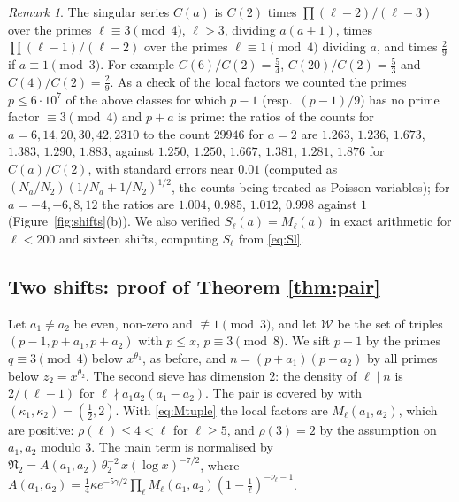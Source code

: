 \documentclass[11pt,a4paper]{amsart}
\theoremstyle{remark}
\newtheorem{remark}[theorem]{Remark}
\numberwithin{equation}{section}
\newcommand{\cW}{\mathcal W}
\newcommand{\cN}{\mathfrak N}
\begin{document}
\begin{remark}\label{rem:counts}
The singular series $C(a)$ is $C(2)$ times $\prod(\ell-2)/(\ell-3)$ over the primes $\ell\equiv3\pmod 4$,
$\ell>3$, dividing $a(a+1)$, times $\prod(\ell-1)/(\ell-2)$ over the primes $\ell\equiv1\pmod4$ dividing $a$,
and times $\frac29$ if $a\equiv1\pmod3$. For example $C(6)/C(2)=\frac54$, $C(20)/C(2)=\frac53$ and
$C(4)/C(2)=\frac29$. As a check of the local factors we counted the primes $p\le6\cdot10^7$ of the above classes
for which $p-1$ (resp.\ $(p-1)/9$) has no prime factor $\equiv3\pmod 4$ and $p+a$ is prime: the ratios of the
counts for $a=6,14,20,30,42,2310$ to the count $29946$ for $a=2$ are $1.263$, $1.236$, $1.673$, $1.383$,
$1.290$, $1.883$, against $1.250$, $1.250$, $1.667$, $1.381$, $1.281$, $1.876$ for $C(a)/C(2)$, with standard
errors near $0.01$ (computed as $(N_a/N_2)(1/N_a+1/N_2)^{1/2}$, the counts being treated as Poisson variables); for $a=-4,-6,8,12$ the ratios are $1.004$, $0.985$, $1.012$, $0.998$ against $1$
(Figure~\ref{fig:shifts}(b)). We also
verified $S_\ell(a)=M_\ell(a)$ in exact arithmetic for $\ell<200$ and sixteen shifts, computing $S_\ell$ from
\eqref{eq:Sl}.
\end{remark}

\subsection{Two shifts: proof of Theorem \texorpdfstring{\ref{thm:pair}}{1.4}}\label{sec:pair}
Let $a_1\ne a_2$ be even, non-zero and $\not\equiv1\pmod 3$, and let $\cW$ be the set of triples
$(p-1,p+a_1,p+a_2)$ with $p\le x$, $p\equiv3\pmod 8$. We sift $p-1$ by the primes $q\equiv3\pmod 4$ below
$x^{\theta_1}$, as before, and $n=(p+a_1)(p+a_2)$ by all primes below $z_2=x^{\theta_2}$. The second sieve has
dimension $2$: the density of $\ell\mid n$ is $2/(\ell-1)$ for $\ell\nmid a_1a_2(a_1-a_2)$. The pair is covered by
\cite[Proposition~3.10]{NX} with $(\kappa_1,\kappa_2)=(\frac12,2)$. With \eqref{eq:Mtuple} the local factors are
$M_\ell(a_1,a_2)$, which are positive: $\rho(\ell)\le4<\ell$ for $\ell\ge5$, and $\rho(3)=2$ by the assumption on
$a_1,a_2$ modulo $3$. The main term is normalised by $\cN_2=A(a_1,a_2)\,\theta_2^{-2}\,x(\log x)^{-7/2}$, where
$A(a_1,a_2)=\frac14\kappa e^{-5\gamma/2}\prod_\ell M_\ell(a_1,a_2)(1-\frac1\ell)^{-\nu_\ell-1}$.
\end{document}
